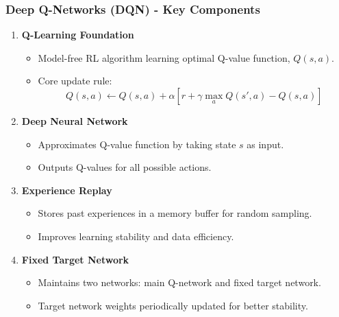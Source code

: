 \documentclass{beamer}
\begin{document}
\begin{frame}[fragile]
    \frametitle{Deep Q-Networks (DQN) - Key Components}
    \begin{enumerate}
        \item \textbf{Q-Learning Foundation}
            \begin{itemize}
                \item Model-free RL algorithm learning optimal Q-value function, $Q(s, a)$.
                \item Core update rule:
                \begin{equation}
                    Q(s, a) \leftarrow Q(s, a) + \alpha [r + \gamma \max_a Q(s', a) - Q(s, a)]
                \end{equation}
            \end{itemize}

        \item \textbf{Deep Neural Network}
            \begin{itemize}
                \item Approximates Q-value function by taking state $s$ as input.
                \item Outputs Q-values for all possible actions.
            \end{itemize}

        \item \textbf{Experience Replay}
            \begin{itemize}
                \item Stores past experiences in a memory buffer for random sampling.
                \item Improves learning stability and data efficiency.
            \end{itemize}

        \item \textbf{Fixed Target Network}
            \begin{itemize}
                \item Maintains two networks: main Q-network and fixed target network.
                \item Target network weights periodically updated for better stability.
            \end{itemize}
    \end{enumerate}
\end{frame}
\end{document}
